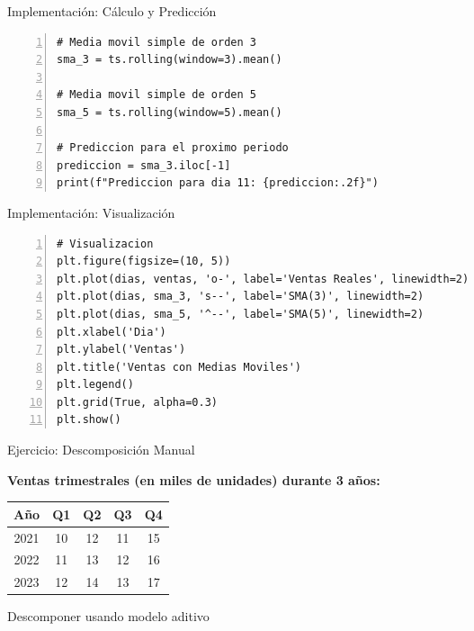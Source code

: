 \documentclass{beamer}
\begin{document}
\begin{frame}[fragile]{Implementación: Cálculo y Predicción}
    \begin{lstlisting}[numbers=left, numbersep=5pt]
# Media movil simple de orden 3
sma_3 = ts.rolling(window=3).mean()

# Media movil simple de orden 5
sma_5 = ts.rolling(window=5).mean()

# Prediccion para el proximo periodo
prediccion = sma_3.iloc[-1]
print(f"Prediccion para dia 11: {prediccion:.2f}")
    \end{lstlisting}
\end{frame}

\begin{frame}[fragile]{Implementación: Visualización}
    \begin{lstlisting}[numbers=left, numbersep=5pt]
# Visualizacion
plt.figure(figsize=(10, 5))
plt.plot(dias, ventas, 'o-', label='Ventas Reales', linewidth=2)
plt.plot(dias, sma_3, 's--', label='SMA(3)', linewidth=2)
plt.plot(dias, sma_5, '^--', label='SMA(5)', linewidth=2)
plt.xlabel('Dia')
plt.ylabel('Ventas')
plt.title('Ventas con Medias Moviles')
plt.legend()
plt.grid(True, alpha=0.3)
plt.show()
    \end{lstlisting}
\end{frame}

\begin{frame}{Ejercicio: Descomposición Manual}
    \begin{center}
        \textbf{Ventas trimestrales (en miles de unidades) durante 3 años:}
        
        \vspace{0.3cm}
        
        \begin{tabular}{ccccc}
            \toprule
            Año & Q1 & Q2 & Q3 & Q4 \\
            \midrule
            2021 & 10 & 12 & 11 & 15 \\
            2022 & 11 & 13 & 12 & 16 \\
            2023 & 12 & 14 & 13 & 17 \\
            \bottomrule
        \end{tabular}
        
        \vspace{0.5cm}
        
        Descomponer usando modelo aditivo
    \end{center}
\end{frame}
\end{document}
